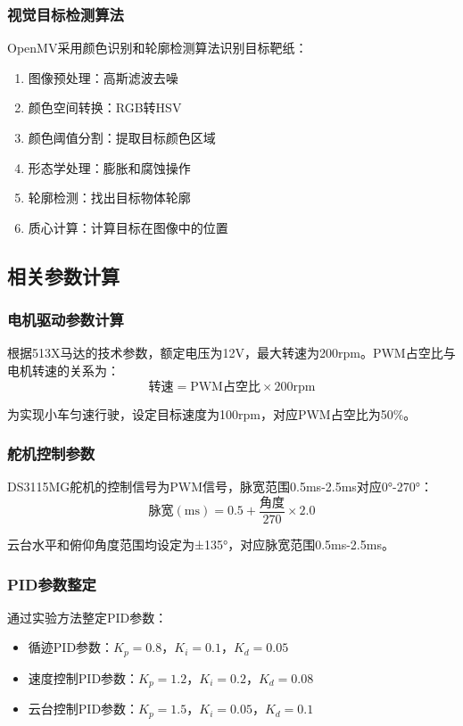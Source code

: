 \documentclass[UTF-8,zihao=-4]{ctexart}
\begin{document}
\subsubsection{视觉目标检测算法}
    OpenMV采用颜色识别和轮廓检测算法识别目标靶纸：
    \begin{enumerate}
        \item 图像预处理：高斯滤波去噪
        \item 颜色空间转换：RGB转HSV
        \item 颜色阈值分割：提取目标颜色区域
        \item 形态学处理：膨胀和腐蚀操作
        \item 轮廓检测：找出目标物体轮廓
        \item 质心计算：计算目标在图像中的位置
    \end{enumerate}
    
\subsection{相关参数计算}
\subsubsection{电机驱动参数计算}
    根据513X马达的技术参数，额定电压为12V，最大转速为200rpm。PWM占空比与电机转速的关系为：
    \begin{equation}
        \text{转速} = \text{PWM占空比} \times 200 \text{rpm}
    \end{equation}
    
    为实现小车匀速行驶，设定目标速度为100rpm，对应PWM占空比为50\%。

\subsubsection{舵机控制参数}
    DS3115MG舵机的控制信号为PWM信号，脉宽范围0.5ms-2.5ms对应0°-270°：
    \begin{equation}
        \text{脉宽}(\text{ms}) = 0.5 + \frac{\text{角度}}{270} \times 2.0
    \end{equation}
    
    云台水平和俯仰角度范围均设定为±135°，对应脉宽范围0.5ms-2.5ms。

\subsubsection{PID参数整定}
    通过实验方法整定PID参数：
    \begin{itemize}
        \item 循迹PID参数：$K_p = 0.8$，$K_i = 0.1$，$K_d = 0.05$
        \item 速度控制PID参数：$K_p = 1.2$，$K_i = 0.2$，$K_d = 0.08$
        \item 云台控制PID参数：$K_p = 1.5$，$K_i = 0.05$，$K_d = 0.1$
    \end{itemize}
    
\end{document}
